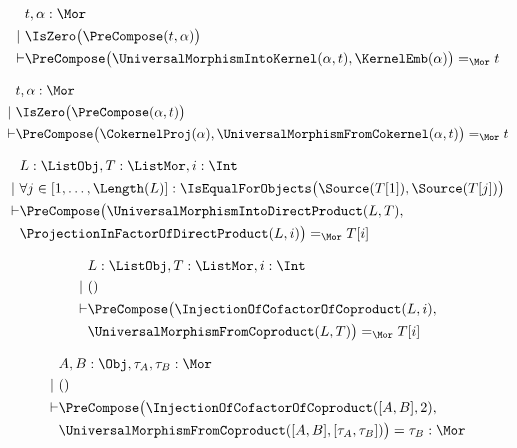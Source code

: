 \begin{sequent}
\begin{align*}
  &t, \alpha:\Mor\\
  |~ &\IsZero\big( \PreCompose( t, \alpha ) \big)\\
  \vdash &\PreCompose\big(\UniversalMorphismIntoKernel( \alpha , t ), \KernelEmb( \alpha ) \big) =_{\Mor} t
\end{align*}
\end{sequent}

\begin{sequent}
\begin{align*}
  &t, \alpha:\Mor\\
  |~  &\IsZero\big(\PreCompose(\alpha, t)\big)\\
  \vdash &\PreCompose\big(\CokernelProj( \alpha ), \UniversalMorphismFromCokernel( \alpha, t )\big) =_{\Mor} t
\end{align*}
\end{sequent}

\begin{sequent}
\begin{align*}
  &L:\ListObj, T:\ListMor, i:\Int\\
  | ~& \forall j \in [ 1, \dots, \Length( L ) ]: \IsEqualForObjects\big(\Source( T[1] ), \Source( T[j] ) \big) \\
  \vdash &\PreCompose\big(\UniversalMorphismIntoDirectProduct( L, T ), \\
  &\ProjectionInFactorOfDirectProduct( L, i ) \big) =_{\Mor} T[i]
\end{align*}
\end{sequent}

\begin{sequent}
\begin{align*}
  &L:\ListObj, T:\ListMor, i:\Int\\
  |~ &()\\
  \vdash &\PreCompose\big(\InjectionOfCofactorOfCoproduct( L, i ),\\
  &\UniversalMorphismFromCoproduct( L, T ) \big) =_{\Mor} T[i]
\end{align*}
\end{sequent}

\begin{sequent}
\begin{align*}
  &A, B:\Obj, \tau_A, \tau_B:\Mor \\
  |~ &()\\
  \vdash &\PreCompose\big(\InjectionOfCofactorOfCoproduct( [A, B], 2 ),\\
  &\UniversalMorphismFromCoproduct( [A,B], [\tau_A, \tau_B] ) \big) = \tau_B:\Mor
\end{align*}
\end{sequent}


